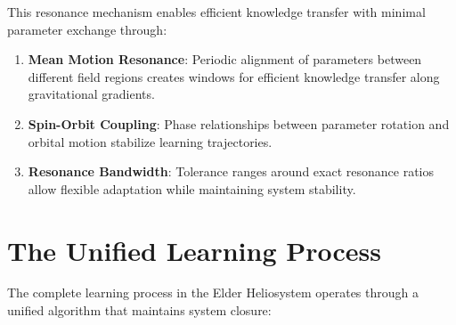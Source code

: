 This resonance mechanism enables efficient knowledge transfer with minimal parameter exchange through:

\begin{enumerate}
    \item \textbf{Mean Motion Resonance}: Periodic alignment of parameters between different field regions creates windows for efficient knowledge transfer along gravitational gradients.
    
    \item \textbf{Spin-Orbit Coupling}: Phase relationships between parameter rotation and orbital motion stabilize learning trajectories.
    
    \item \textbf{Resonance Bandwidth}: Tolerance ranges around exact resonance ratios allow flexible adaptation while maintaining system stability.
\end{enumerate}

\section{The Unified Learning Process}

The complete learning process in the Elder Heliosystem operates through a unified algorithm that maintains system closure:

